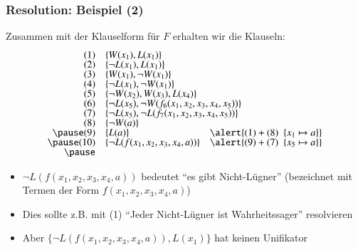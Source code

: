 \documentclass[aspectratio=1610,onlymath]{beamer}
\begin{document}
\begin{frame}[t]\frametitle{Resolution: Beispiel (2)}

Zusammen mit der Klauselform für $F$ erhalten wir die Klauseln:
%
{\small%
\[\begin{array}{rll}
(1) & \{W(x_1), L(x_1)\}\\[-0.5ex]
(2) & \{\neg L(x_1), L(x_1)\}\\[-0.5ex]
(3) & \{W(x_1), \neg W(x_1)\}\\[-0.5ex]
(4) & \{\neg L(x_1), \neg W(x_1)\}\\[-0.5ex]
(5) & \{\neg W(x_2), W(x_3), L(x_4)\}\\[-0.5ex]
(6) & \{\neg L(x_5),\ghost{$\neg W(f_6(x_1,x_2,x_3,x_4,x_5))\}$}\\[-0.5ex]
(7) & \{\neg L(x_5),\ghost{$\neg L(f_7(x_1,x_2,x_3,x_4,x_5))\}$} \\[-0.5ex]
(8) & \{\neg W(a)\}\\[-0.5ex]\pause
(9) & \{L(a)\} & \alert{(1)+(8)~~ \{x_1\mapsto a\}}\\[-0.5ex]\pause
(10) & \{\neg L(f(x_1,x_2,x_3,x_4,a))\} & \alert{(9)+(7)~~ \{x_5\mapsto a\}}\\[-0.5ex]\pause
\end{array}
\]}\vspace{-3.5ex}


\hspace{-2mm}%
\begin{minipage}[t]{8.5cm}\footnotesize\vspace{-2ex}
\begin{itemize}
\item $\neg L(f(x_1,x_2,x_3,x_4,a))$ bedeutet "`es gibt Nicht-Lügner"' (bezeichnet mit Termen der Form $f(x_1,x_2,x_3,x_4,a)$)\\[-2ex]
\item Dies sollte z.B. mit (1) "`Jeder Nicht-Lügner ist Wahrheitssager"' resolvieren\\[-2ex]
\item Aber $\{\neg L(f(x_1,x_2,x_3,x_4,a)), L(x_1)\}$ hat keinen Unifikator
\end{itemize}
\end{minipage}

\end{frame}
\end{document}

